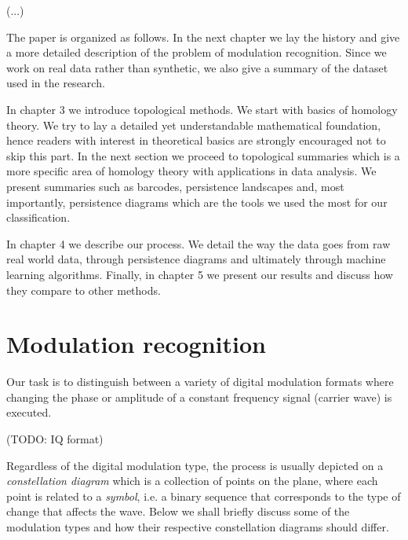 \documentclass[12pt]{article}
\theoremstyle{plain}
\theoremstyle{definition}
\theoremstyle{remark}
\begin{document}
	(...)
	
	The paper is organized as follows. In the next chapter we lay the history and give a more detailed description of the problem of modulation recognition. Since we work on real data rather than synthetic, we also give a summary of the dataset used in the research.
	
	In chapter 3 we introduce topological methods. We start with basics of homology theory. We try to lay a detailed yet understandable mathematical foundation, hence readers with interest in theoretical basics are strongly encouraged not to skip this part. In the next section we proceed to topological summaries which is a more specific area of homology theory with applications in data analysis. We present summaries such as barcodes, persistence landscapes and, most importantly, persistence diagrams which are the tools we used the most for our classification.
	
	In chapter 4 we describe our process. We detail the way the data goes from raw real world data, through persistence diagrams and ultimately through machine learning algorithms. Finally, in chapter 5 we present our results and discuss how they compare to other methods.
	
	\section{Modulation recognition}
	
	Our task is to distinguish between a variety of digital modulation formats where changing the phase or amplitude of a constant frequency signal (carrier wave) is executed.
	
	(TODO: IQ format)
	
	Regardless of the digital modulation type, the process is usually depicted on a \textit{constellation diagram} which is a collection of points on the plane, where each point is related to a \textit{symbol}, i.e. a binary sequence that corresponds to the type of change that affects the wave. Below we shall briefly discuss some of the modulation types and how their respective constellation diagrams should differ.
	
\end{document}
